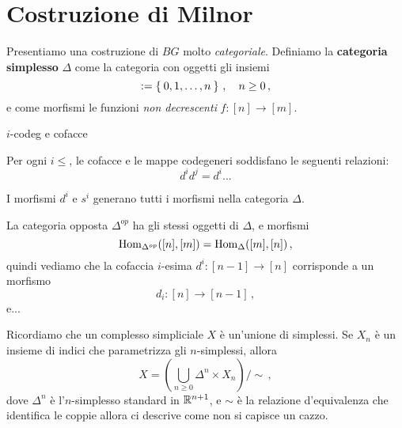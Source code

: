 



\section{Costruzione di Milnor}


Presentiamo una costruzione di $BG$ molto \emph{categoriale}.
Definiamo la \textbf{categoria simplesso} $\Delta$ come
la categoria con oggetti gli insiemi
\begin{equation*}
	[n] := \Set{0, 1, \dots, n}\,,
	\quad n \ge 0\,,
\end{equation*}
e come morfismi le funzioni \emph{non decrescenti} $f:[n] \to [m]$.

\begin{ex}
	$i$-codeg e cofacce
\end{ex}

\begin{lemma}
	Per ogni $i \le $, le cofacce e le mappe codegeneri soddisfano le seguenti relazioni:
	\begin{equation*}
		d^{i}d^{j} = d^{i}...
	\end{equation*}
\end{lemma}

\begin{fact}
	I morfismi $d^{i}$ e $s^{i}$ generano tutti i morfismi nella categoria $\Delta$.
\end{fact}

La categoria opposta $\Delta^{op}$ ha gli stessi oggetti di $\Delta$,
e morfismi
\begin{equation*}
	\operatorname{Hom}_{\Delta^{op}}([n],[m]) = \operatorname{Hom}_{\Delta}([m],[n])\,,
\end{equation*}
quindi vediamo che la cofaccia $i$-esima $d^{i}:[n-1] \to [n]$
corrisponde a un morfismo
\begin{equation*}
	d_{i}:[n] \longrightarrow [n-1]\,,
\end{equation*}
e...

Ricordiamo che un complesso simpliciale $X$ è un'unione di simplessi.
Se $X_{n}$ è un insieme di indici che parametrizza gli $n$-simplessi,
allora
\begin{equation*}
	X = \left( \bigcup_{n \ge 0} \Delta^{n} \times X_{n} \right) / \sim\,,
\end{equation*}
dove $\Delta^{n}$ è l'$n$-simplesso standard in ${\mathbb R}^{n+1}$,
e $\sim$ è la relazione d'equivalenza che identifica le coppie
allora ci descrive come non si capisce un cazzo.

